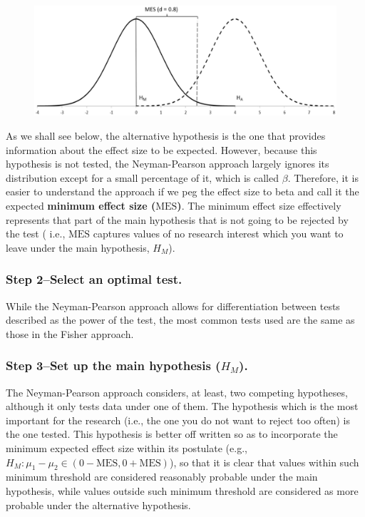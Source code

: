 \documentclass[
]{book}
\theoremstyle{definition}
\theoremstyle{definition}
\theoremstyle{definition}
\theoremstyle{definition}
\theoremstyle{remark}
\begin{document}
\begin{figure}

{\centering \includegraphics[width=0.6\linewidth]{images/Perezgonzalez2015Fig3} 

}

\end{figure}

As we shall see below, the alternative hypothesis is the one that provides information about the effect size to be expected. However, because this hypothesis is not tested, the Neyman-Pearson approach largely ignores its distribution except for a small percentage of it, which is called \(\beta\). Therefore, it is easier to understand the approach if we peg the effect size to beta and call it the expected \textbf{minimum effect size (\(\mbox{MES}\))}. The minimum effect size effectively represents that part of the main hypothesis that is not going to be rejected by the test ( i.e., \(\mbox{MES}\) captures values of no research interest which you want to leave under the main hypothesis, \(H_M\)).

\hypertarget{step-2select-an-optimal-test.}{%
\subsubsection*{Step 2--Select an optimal test.}\label{step-2select-an-optimal-test.}}

While the Neyman-Pearson approach allows for differentiation between tests described as the power of the test, the most common tests used are the same as those in the Fisher approach.

\hypertarget{step-3set-up-the-main-hypothesis-h_m.}{%
\subsubsection*{\texorpdfstring{Step 3--Set up the main hypothesis (\(H_M\)).}{Step 3--Set up the main hypothesis (H\_M).}}\label{step-3set-up-the-main-hypothesis-h_m.}}

The Neyman-Pearson approach considers, at least, two competing hypotheses, although it only tests data under one of them. The hypothesis which is the most important for the research (i.e., the one you do not want to reject too often) is the one tested. This hypothesis is better off written so as to incorporate the minimum expected effect size within its postulate (e.g., \(H_M: \mu_1-\mu_2 \in (0 - \mbox{MES}, 0 + \mbox{MES})\)), so that it is clear that values within such minimum threshold are considered reasonably probable under the main hypothesis, while values outside such minimum threshold are considered as more probable under the alternative hypothesis.
\end{document}
